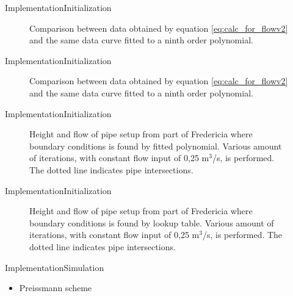\begin{frame}{Implementation}{Initialization}
    \begin{figure}[H]
 \centering
 
\caption{Comparison between data obtained by equation \ref{eq:calc_for_flowv2} and the same data curve fitted to a ninth order polynomial.}
\label{fig:curvefit_comparision}
\end{figure}
\end{frame}

\begin{frame}{Implementation}{Initialization}
\begin{figure}[H]
 \centering
 
\caption{Comparison between data obtained by equation \ref{eq:calc_for_flowv2} and the same data curve fitted to a ninth order polynomial.}
\label{fig:curvefit_comparision_split}
\end{figure}


\end{frame}



\begin{frame}{Implementation}{Initialization}
 \begin{figure}[H]
 \centering
 
\caption{Height and flow of pipe setup from part of Fredericia where boundary conditions is found by fitted polynomial. Various amount of iterations, with constant flow input of 0,25 $\text{m}^\text{3}$/s, is performed. The dotted line indicates pipe intersections.}
\label{fig:fredericia_init_steady_state}
\end{figure}   


\end{frame}

\begin{frame}{Implementation}{Initialization}
 \begin{figure}[H]
 \centering
 
\caption{Height and flow of pipe setup from part of Fredericia where boundary conditions is found by lookup table. Various amount of iterations, with constant flow input of 0,25 $\text{m}^\text{3}$/s, is performed. The dotted line indicates pipe intersections.}
\label{fig:fredericia_init_steady_state_lut}
\end{figure}   
\end{frame}



\begin{frame}{Implementation}{Simulation}
    \begin{itemize}
    	\item Preissmann scheme 
    \end{itemize}


\end{frame}

